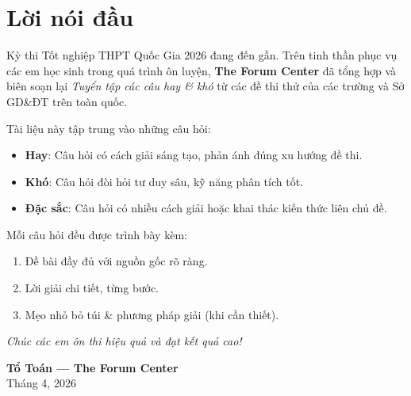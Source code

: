 
\frontmatter

\tableofcontents
\clearpage

\chapter*{Lời nói đầu}

Kỳ thi Tốt nghiệp THPT Quốc Gia 2026 đang đến gần. Trên tinh thần phục vụ các em học sinh trong quá trình ôn luyện, \textbf{The Forum Center} đã tổng hợp và biên soạn lại \textit{Tuyển tập các câu hay \& khó} từ các đề thi thử của các trường và Sở GD\&ĐT trên toàn quốc.

Tài liệu này tập trung vào những câu hỏi:
\begin{itemize}[leftmargin=2em, itemsep=4pt]
  \item \textbf{Hay}: Câu hỏi có cách giải sáng tạo, phản ánh đúng xu hướng đề thi.
  \item \textbf{Khó}: Câu hỏi đòi hỏi tư duy sâu, kỹ năng phân tích tốt.
  \item \textbf{Đặc sắc}: Câu hỏi có nhiều cách giải hoặc khai thác kiến thức liên chủ đề.
\end{itemize}

Mỗi câu hỏi đều được trình bày kèm:
\begin{enumerate}[leftmargin=2em, itemsep=4pt]
  \item Đề bài đầy đủ với nguồn gốc rõ ràng.
  \item Lời giải chi tiết, từng bước.
  \item Mẹo nhỏ bỏ túi \& phương pháp giải (khi cần thiết).
\end{enumerate}

\vspace{10pt}
\begin{center}
  \textit{\color{ForumDarkBlue}Chúc các em ôn thi hiệu quả và đạt kết quả cao!}
\end{center}

\vfill
\begin{flushright}
  \textbf{Tổ Toán — The Forum Center}\\
  Tháng 4, 2026
\end{flushright}

\clearpage

